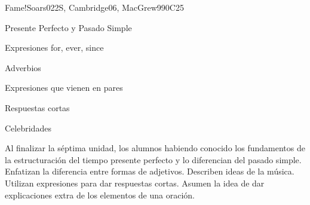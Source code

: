 \begin{syllabus}
\begin{unit}{Fame!}{}{Soars022S, Cambridge06, MacGrew99}{0}{C25}
   \begin{topics}
      \item Presente Perfecto y Pasado Simple
      \item Expresiones for, ever, since
      \item Adverbios
      \item Expresiones que vienen en pares 
      \item Respuestas cortas
      \item Celebridades
   \end{topics}

   \begin{learningoutcomes}
      \item Al finalizar la séptima unidad, los alumnos habiendo conocido los fundamentos de la estructuración del tiempo presente perfecto y lo diferencian del pasado simple. Enfatizan la diferencia entre formas de adjetivos. Describen ideas de la música. Utilizan expresiones para dar respuestas cortas. Asumen la idea de dar explicaciones extra de los elementos de una oración.
   \end{learningoutcomes}
\end{unit}



\begin{coursebibliography}
\end{coursebibliography}

\end{syllabus}
%
